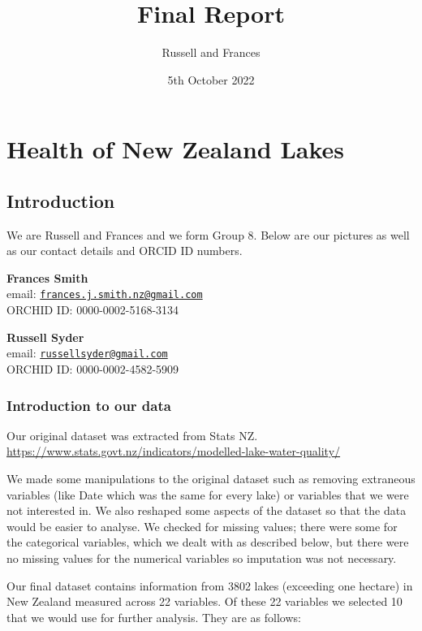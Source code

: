 \documentclass[
]{article}
\title{Final Report}
\author{Russell and Frances}
\date{5th October 2022}
\begin{document}
\maketitle

{
\setcounter{tocdepth}{2}
\tableofcontents
}
\hypertarget{health-of-new-zealand-lakes}{%
\section{Health of New Zealand Lakes}\label{health-of-new-zealand-lakes}}

\hypertarget{introduction}{%
\subsection{Introduction}\label{introduction}}

We are Russell and Frances and we form Group 8. Below are our pictures as well as our contact details and ORCID ID numbers.

\textbf{Frances Smith}\\
email: \href{mailto:frances.j.smith.nz@gmail.com}{\nolinkurl{frances.j.smith.nz@gmail.com}}\\
ORCHID ID: 0000-0002-5168-3134

\textbf{Russell Syder}\\
email: \href{mailto:russellsyder@gmail.com}{\nolinkurl{russellsyder@gmail.com}}\\
ORCHID ID: 0000-0002-4582-5909

\hypertarget{introduction-to-our-data}{%
\subsubsection{Introduction to our data}\label{introduction-to-our-data}}

Our original dataset was extracted from Stats NZ.
\url{https://www.stats.govt.nz/indicators/modelled-lake-water-quality/}

We made some manipulations to the original dataset such as removing extraneous variables (like Date which was the same for every lake) or variables that we were not interested in. We also reshaped some aspects of the dataset so that the data would be easier to analyse. We checked for missing values; there were some for the categorical variables, which we dealt with as described below, but there were no missing values for the numerical variables so imputation was not necessary.

Our final dataset contains information from 3802 lakes (exceeding one hectare) in New Zealand measured across 22 variables. Of these 22 variables we selected 10 that we would use for further analysis. They are as follows:
\end{document}
